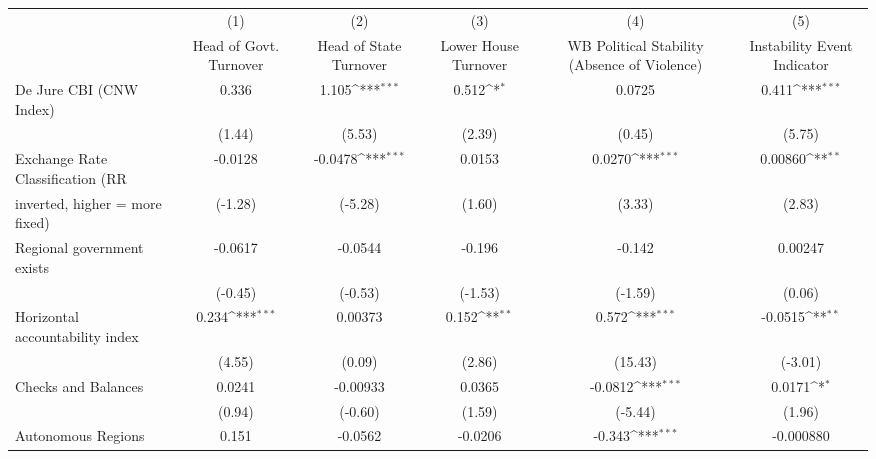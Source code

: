 {
\def\sym#1{\ifmmode^{#1}\else\(^{#1}\)\fi}
\begin{tabular}{l*{5}{c}}
\toprule
                                        &\multicolumn{1}{c}{(1)}&\multicolumn{1}{c}{(2)}&\multicolumn{1}{c}{(3)}&\multicolumn{1}{c}{(4)}&\multicolumn{1}{c}{(5)}\\
                                        &\multicolumn{1}{c}{Head of Govt. Turnover}&\multicolumn{1}{c}{Head of State Turnover}&\multicolumn{1}{c}{Lower House Turnover}&\multicolumn{1}{c}{WB Political Stability (Absence of Violence)}&\multicolumn{1}{c}{Instability Event Indicator}\\
\midrule
De Jure CBI (CNW Index)                 &    0.336         &    1.105\sym{***}&    0.512\sym{*}  &   0.0725         &    0.411\sym{***}\\
                                        &   (1.44)         &   (5.53)         &   (2.39)         &   (0.45)         &   (5.75)         \\
\addlinespace
Exchange Rate Classification (RR        &  -0.0128         &  -0.0478\sym{***}&   0.0153         &   0.0270\sym{***}&  0.00860\sym{**} \\
inverted, higher = more fixed)          &  (-1.28)         &  (-5.28)         &   (1.60)         &   (3.33)         &   (2.83)         \\
\addlinespace
Regional government exists              &  -0.0617         &  -0.0544         &   -0.196         &   -0.142         &  0.00247         \\
                                        &  (-0.45)         &  (-0.53)         &  (-1.53)         &  (-1.59)         &   (0.06)         \\
\addlinespace
Horizontal accountability index         &    0.234\sym{***}&  0.00373         &    0.152\sym{**} &    0.572\sym{***}&  -0.0515\sym{**} \\
                                        &   (4.55)         &   (0.09)         &   (2.86)         &  (15.43)         &  (-3.01)         \\
\addlinespace
Checks and Balances                     &   0.0241         & -0.00933         &   0.0365         &  -0.0812\sym{***}&   0.0171\sym{*}  \\
                                        &   (0.94)         &  (-0.60)         &   (1.59)         &  (-5.44)         &   (1.96)         \\
\addlinespace
Autonomous Regions                      &    0.151         &  -0.0562         &  -0.0206         &   -0.343\sym{***}&-0.000880         \\

\end{tabular}}
